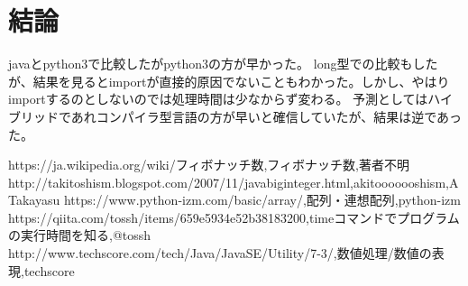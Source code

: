 \documentclass[a4j]{jreport}
\begin{document}
\chapter{結論}
javaとpython3で比較したがpython3の方が早かった。
long型での比較もしたが、結果を見るとimportが直接的原因でないこともわかった。しかし、やはりimportするのとしないのでは処理時間は少なからず変わる。
予測としてはハイブリッドであれコンパイラ型言語の方が早いと確信していたが、結果は逆であった。

\begin{thebibliography}{99}
https://ja.wikipedia.org/wiki/フィボナッチ数,フィボナッチ数,著者不明
http://takitoshism.blogspot.com/2007/11/javabiginteger.html,akitooooooshism,A Takayasu
https://www.python-izm.com/basic/array/,配列・連想配列,python-izm
https://qiita.com/tossh/items/659e5934e52b38183200,timeコマンドでプログラムの実行時間を知る,@tossh
  http://www.techscore.com/tech/Java/JavaSE/Utility/7-3/,数値処理/数値の表現,techscore
  \end{thebibliography}
\end{document}
